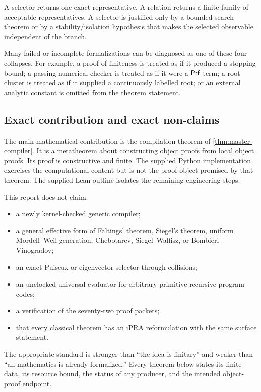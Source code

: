 \begin{definition}
A selector returns one exact representative.  A relation returns a finite family of acceptable representatives.  A selector is justified only by a bounded search theorem or by a stability/isolation hypothesis that makes the selected observable independent of the branch.
\end{definition}

Many failed or incomplete formalizations can be diagnosed as one of these four collapses.  For example, a proof of finiteness is treated as if it produced a stopping bound; a passing numerical checker is treated as if it were a \(\mathsf{Prf}\) term; a root cluster is treated as if it supplied a continuously labelled root; or an external analytic constant is omitted from the theorem statement.

\subsection{Exact contribution and exact non-claims}

The main mathematical contribution is the compilation theorem of \cref{thm:master-compiler}.  It is a metatheorem about constructing object proofs from local object proofs.  Its proof is constructive and finite.  The supplied Python implementation exercises the computational content but is not the proof object promised by that theorem.  The supplied Lean outline isolates the remaining engineering steps.

This report does not claim:

\begin{itemize}
  \item a newly kernel-checked generic compiler;
  \item a general effective form of Faltings' theorem, Siegel's theorem, uniform Mordell--Weil generation, Chebotarev, Siegel--Walfisz, or Bombieri--Vinogradov;
  \item an exact Puiseux or eigenvector selector through collisions;
  \item an unclocked universal evaluator for arbitrary primitive-recursive program codes;
  \item a verification of the seventy-two proof packets;
  \item that every classical theorem has an iPRA reformulation with the same surface statement.
\end{itemize}

The appropriate standard is stronger than ``the idea is finitary'' and weaker than ``all mathematics is already formalized.''  Every theorem below states its finite data, its resource bound, the status of any producer, and the intended object-proof endpoint.
